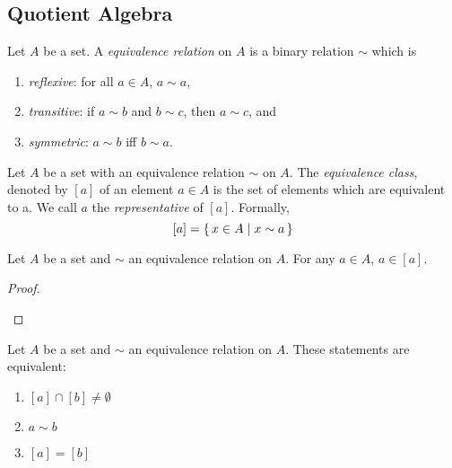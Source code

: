 


\subsection{Quotient Algebra}

\begin{definition}
Let $A$ be a set. 
A {\em equivalence relation} on $A$ is a binary relation $\sim$ which is
\begin{enumerate}
\item {\em reflexive}: for all $a \in A$,  $a \sim a$,
\item {\em transitive}:  if $a \sim b$ and $b \sim c$, then $a \sim c$, and
\item {\em symmetric}:  $a \sim b$ iff  $b \sim a$.
\end{enumerate}
\end{definition}


\begin{definition}
Let $A$ be a set with an equivalence relation $\sim$ on $A$.
The {\em equivalence class}, denoted by $[a]$ of an element $a \in A$ 
is the set  of elements which are equivalent to a. 
We call $a$ the {\em representative} of $[a]$.
Formally,
\[ 
[a] = \set{ x \in A | x \sim a}
\]
\end{definition}

\begin{proposition}
Let $A$ be a set and $\sim$ an equivalence relation on $A$. 
For any $a \in A$, $a \in [a]$.
\end{proposition}

\begin{proof}
\begin{prooftree}
\end{prooftree}
\end{proof}

\begin{lemma}
Let $A$ be a set and $\sim$ an equivalence relation on $A$. 
These statements are equivalent:
\begin{enumerate}
\item $[a] \cap [b] \neq \emptyset$
\item $a \sim b$
\item $ [a] = [b]$
\end{enumerate}
\end{lemma}

